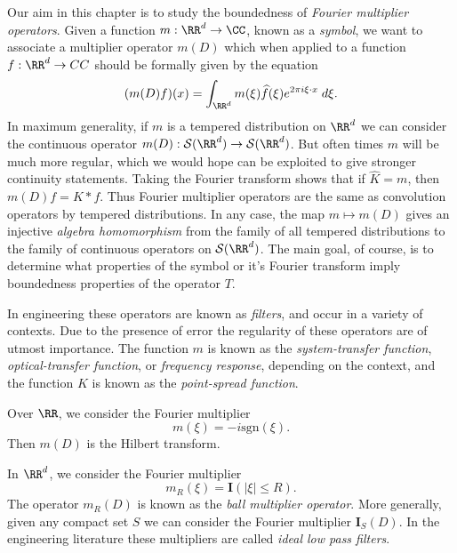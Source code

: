 Our aim in this chapter is to study the boundedness of \emph{Fourier multiplier operators}. Given a function $m: \RR^d \to \CC$, known as a \emph{symbol}, we want to associate a multiplier operator $m(D)$ which when applied to a function $f: \RR^d \to CC$ should be formally given by the equation
%
\[ (m(D)f)(x) = \int_{\RR^d} m(\xi) \widehat{f}(\xi) e^{2 \pi i \xi \cdot x}\; d\xi. \]
%
In maximum generality, if $m$ is a tempered distribution on $\RR^d$ we can consider the continuous operator $m(D): \mathcal{S}(\RR^d) \to \mathcal{S}(\RR^d)$. But often times $m$ will be much more regular, which we would hope can be exploited to give stronger continuity statements. Taking the Fourier transform shows that if $\widehat{K} = m$, then $m(D) f = K * f$. Thus Fourier multiplier operators are the same as convolution operators by tempered distributions. In any case, the map $m \mapsto m(D)$ gives an injective \emph{algebra homomorphism} from the family of all tempered distributions to the family of continuous operators on $\mathcal{S}(\RR^d)$. The main goal, of course, is to determine what properties of the symbol or it's Fourier transform imply boundedness properties of the operator $T$.

\begin{remark}
  In engineering these operators are known as \emph{filters}, and occur in a variety of contexts. Due to the presence of error the regularity of these operators are of utmost importance. The function $m$ is known as the \emph{system-transfer function}, \emph{optical-transfer function}, or \emph{frequency response}, depending on the context, and the function $K$ is known as the \emph{point-spread function}.
\end{remark}

\begin{example}
  Over $\RR$, we consider the Fourier multiplier
  \[ m(\xi) = - i \text{sgn}(\xi). \]
  Then $m(D)$ is the Hilbert transform.
\end{example}

\begin{example}
  In $\RR^d$, we consider the Fourier multiplier
  \[ m_R(\xi) = \mathbf{I}(|\xi| \leq R). \]
  The operator $m_R(D)$ is known as the \emph{ball multiplier operator}. More generally, given any compact set $S$ we can consider the Fourier multiplier $\mathbf{I}_S(D)$. In the engineering literature these multipliers are called \emph{ideal low pass filters}.
\end{example}

